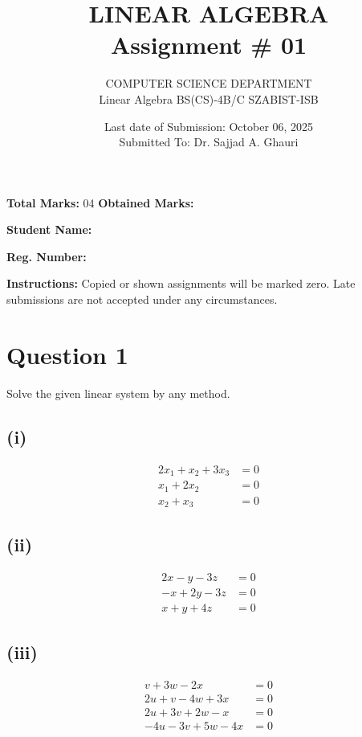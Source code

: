 \documentclass[12pt]{article}
\title{LINEAR ALGEBRA\\Assignment \# 01}
\author{COMPUTER SCIENCE DEPARTMENT\\
Linear Algebra BS(CS)-4B/C SZABIST-ISB}
\date{Last date of Submission: October 06, 2025\\
Submitted To: Dr. Sajjad A. Ghauri}
\begin{document}
\maketitle

\noindent\textbf{Total Marks:} 04 \hfill \textbf{Obtained Marks:} \underline{\hspace{2cm}}

\vspace{0.5cm}
\noindent\textbf{Student Name:} \underline{\hspace{8cm}}

\noindent\textbf{Reg. Number:} \underline{\hspace{8cm}}

\vspace{0.5cm}
\noindent\textbf{Instructions:} Copied or shown assignments will be marked zero. Late submissions are not accepted under any circumstances.

\section*{Question 1}
Solve the given linear system by any method.

\subsection*{(i)}
\begin{align*}
2x_1 + x_2 + 3x_3 &= 0\\
x_1 + 2x_2 &= 0\\
x_2 + x_3 &= 0
\end{align*}

\subsection*{(ii)}
\begin{align*}
2x - y - 3z &= 0\\
-x + 2y - 3z &= 0\\
x + y + 4z &= 0
\end{align*}

\subsection*{(iii)}
\begin{align*}
v + 3w - 2x &= 0\\
2u + v - 4w + 3x &= 0\\
2u + 3v + 2w - x &= 0\\
-4u - 3v + 5w - 4x &= 0
\end{align*}
\end{document}
